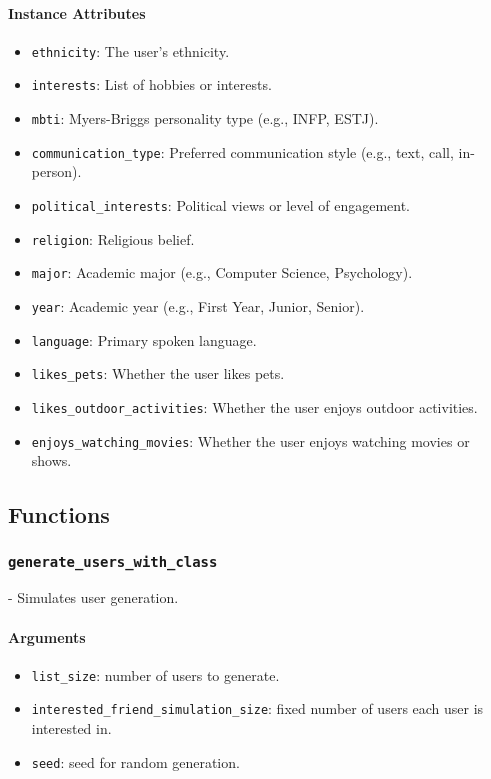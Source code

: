 \documentclass[fontsize=11pt]{article}
\begin{document}
\paragraph{Instance Attributes}
\begin{itemize}
    \item \texttt{ethnicity}: The user's ethnicity.
    \item \texttt{interests}: List of hobbies or interests.
    \item \texttt{mbti}: Myers-Briggs personality type (e.g., INFP, ESTJ).
    \item \texttt{communication\_type}: Preferred communication style (e.g., text, call, in-person).
    \item \texttt{political\_interests}: Political views or level of engagement.
    \item \texttt{religion}: Religious belief.
    \item \texttt{major}: Academic major (e.g., Computer Science, Psychology).
    \item \texttt{year}: Academic year (e.g., First Year, Junior, Senior).
    \item \texttt{language}: Primary spoken language.
    \item \texttt{likes\_pets}: Whether the user likes pets.
    \item \texttt{likes\_outdoor\_activities}: Whether the user enjoys outdoor activities.
    \item \texttt{enjoys\_watching\_movies}: Whether the user enjoys watching movies or shows.
\end{itemize}

\subsection*{Functions}

\subsubsection*{\texttt{generate\_users\_with\_class}}
- Simulates user generation.

\paragraph{Arguments}
\begin{itemize}
    \item \texttt{list\_size}: number of users to generate.
    \item \texttt{interested\_friend\_simulation\_size}: fixed number of users each user is interested in.
    \item \texttt{seed}: seed for random generation.
\end{itemize}
\end{document}
